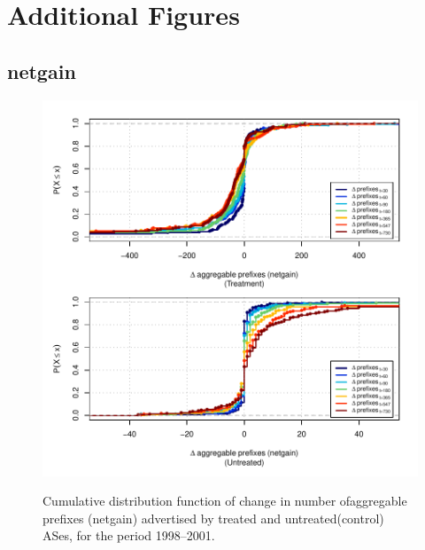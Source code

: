 \chapter{Additional Figures}
\label{chap:additional_figs}

\section{netgain}

\begin{figure}[H]
\begin{centering}
\begin{singlespace}
    \includegraphics[width=6in]{figures/behavior-netgain-1998_2001-corr.pdf}
    \vspace{-2em}\\
    \caption{Cumulative distribution function of change in number ofaggregable prefixes (netgain) advertised by treated and untreated(control) ASes, for the period 1998--2001.}
\end{singlespace}
\end{centering}
\end{figure}

